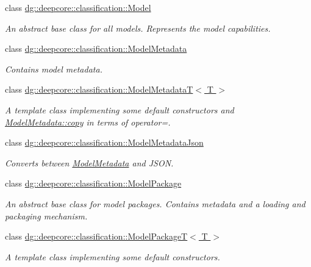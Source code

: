 \begin{DoxyCompactItemize}
class \hyperlink{classdg_1_1deepcore_1_1classification_1_1_model}{dg\+::deepcore\+::classification\+::\+Model}
\begin{DoxyCompactList}\small\item\em An abstract base class for all models. Represents the model capabilities. \end{DoxyCompactList}\item 
class \hyperlink{classdg_1_1deepcore_1_1classification_1_1_model_metadata}{dg\+::deepcore\+::classification\+::\+Model\+Metadata}
\begin{DoxyCompactList}\small\item\em Contains model metadata. \end{DoxyCompactList}\item 
class \hyperlink{classdg_1_1deepcore_1_1classification_1_1_model_metadata_t}{dg\+::deepcore\+::classification\+::\+Model\+Metadata\+T$<$ T $>$}
\begin{DoxyCompactList}\small\item\em A template class implementing some default constructors and \hyperlink{group___classification_module_ga851d179b56e5c32b25512df0141f3ca2}{Model\+Metadata\+::copy} in terms of operator=. \end{DoxyCompactList}\item 
class \hyperlink{classdg_1_1deepcore_1_1classification_1_1_model_metadata_json}{dg\+::deepcore\+::classification\+::\+Model\+Metadata\+Json}
\begin{DoxyCompactList}\small\item\em Converts between \hyperlink{classdg_1_1deepcore_1_1classification_1_1_model_metadata}{Model\+Metadata} and J\+S\+ON. \end{DoxyCompactList}\item 
class \hyperlink{classdg_1_1deepcore_1_1classification_1_1_model_package}{dg\+::deepcore\+::classification\+::\+Model\+Package}
\begin{DoxyCompactList}\small\item\em An abstract base class for model packages. Contains metadata and a loading and packaging mechanism. \end{DoxyCompactList}\item 
class \hyperlink{classdg_1_1deepcore_1_1classification_1_1_model_package_t}{dg\+::deepcore\+::classification\+::\+Model\+Package\+T$<$ T $>$}
\begin{DoxyCompactList}\small\item\em A template class implementing some default constructors. \end{DoxyCompactList}\item 

\end{DoxyCompactItemize}
